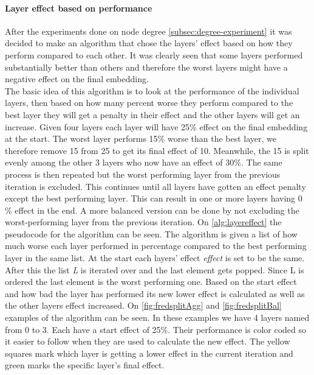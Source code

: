 \paragraph{Layer effect based on performance} \label{fredsplit}
After the experiments done on node degree \autoref{subsec:degree-experiment} it was decided to make an algorithm that chose the layers' effect based on how they perform compared to each other.
It was clearly seen that some layers performed substantially better than others and therefore the worst layers might have a negative effect on the final embedding.
\\
The basic idea of this algorithm is to look at the performance of the individual layers, then based on how many percent worse they perform compared to the best layer they will get a penalty in their effect and the other layers will get an increase.
Given four layers each layer will have 25\% effect on the final embedding at the start.
The worst layer performs 15\% worse than the best layer, we therefore remove 15 from 25 to get its final effect of 10.
Meanwhile, the 15 is split evenly among the other 3 layers who now have an effect of 30\%.
The same process is then repeated but the worst performing layer from the previous iteration is excluded.
This continues until all layers have gotten an effect penalty except the best performing layer.
This can result in one or more layers having 0 \% effect in the end.
A more balanced version can be done by not excluding the worst-performing layer from the previous iteration.
On \autoref{alg:layereffect} the pseudocode for the algorithm can be seen.
The algorithm is given a list of how much worse each layer performed in percentage compared to the best performing layer in the same list.
At the start each layers' effect \textit{effect} is set to be the same.
After this the list \textit{L} is iterated over and the last element gets popped.
Since L is ordered the last element is the worst performing one.
Based on the start effect and how bad the layer has performed its new lower effect is calculated as well as the other layers effect increased.
On \autoref{fig:fredsplitAgg} and \autoref{fig:fredsplitBal} examples of the algorithm can be seen.
In these examples we have 4 layers named from 0 to 3.
Each have a start effect of 25\%.
Their performance is color coded so it easier to follow when they are used to calculate the new effect.
The yellow squares mark which layer is getting a lower effect in the current iteration and green marks the specific layer's final effect.

